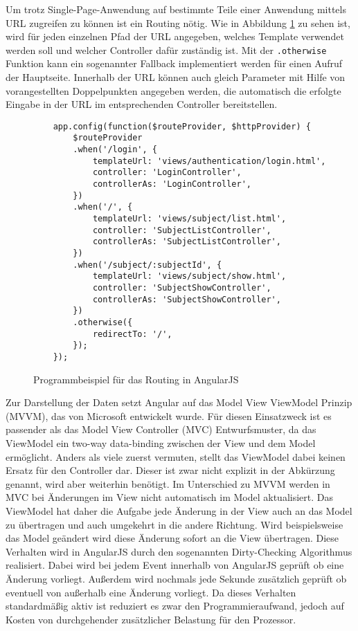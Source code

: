 Um trotz Single-Page-Anwendung auf bestimmte Teile einer Anwendung mittels URL zugreifen zu können ist ein Routing nötig.
Wie in Abbildung \ref{f:angularjs:routing} zu sehen ist, wird für jeden einzelnen Pfad der URL angegeben, welches Template verwendet werden soll und welcher Controller dafür zuständig ist.
Mit der \texttt{.otherwise} Funktion kann ein sogenannter Fallback implementiert werden für einen Aufruf der Hauptseite.
Innerhalb der URL können auch gleich Parameter mit Hilfe von vorangestellten Doppelpunkten angegeben werden, die automatisch die erfolgte Eingabe in der URL im entsprechenden Controller bereitstellen.

\begin{figure}[t]
	\centering
	\begin{lstlisting}
	app.config(function($routeProvider, $httpProvider) {
		$routeProvider
		.when('/login', {
			templateUrl: 'views/authentication/login.html',
			controller: 'LoginController',
			controllerAs: 'LoginController',
		})
		.when('/', {
			templateUrl: 'views/subject/list.html',
			controller: 'SubjectListController',
			controllerAs: 'SubjectListController',
		})
		.when('/subject/:subjectId', {
			templateUrl: 'views/subject/show.html',
			controller: 'SubjectShowController',
			controllerAs: 'SubjectShowController',
		})
		.otherwise({
			redirectTo: '/',
		});		
	});
	\end{lstlisting}
	\caption{Programmbeispiel für das Routing in AngularJS}
	\label{f:angularjs:routing}
\end{figure}

Zur Darstellung der Daten setzt Angular auf das Model View ViewModel Prinzip (MVVM), das von Microsoft entwickelt wurde.
Für diesen Einsatzweck ist es passender als das Model View Controller (MVC) Entwurfsmuster, da das ViewModel ein two-way data-binding zwischen der View und dem Model ermöglicht.
Anders als viele zuerst vermuten, stellt das ViewModel dabei keinen Ersatz für den Controller dar.
Dieser ist zwar nicht explizit in der Abkürzung genannt, wird aber weiterhin benötigt.
Im Unterschied zu MVVM werden in MVC bei Änderungen im View nicht automatisch im Model aktualisiert.
Das ViewModel hat daher die Aufgabe jede Änderung in der View auch an das Model zu übertragen und auch umgekehrt in die andere Richtung.
Wird beispielsweise das Model geändert wird diese Änderung sofort an die View übertragen.
Diese Verhalten wird in AngularJS durch den sogenannten Dirty-Checking Algorithmus realisiert.
Dabei wird bei jedem Event innerhalb von AngularJS geprüft ob eine Änderung vorliegt.
Außerdem wird nochmals jede Sekunde zusätzlich geprüft ob eventuell von außerhalb eine Änderung vorliegt.
Da dieses Verhalten standardmäßig aktiv ist reduziert es zwar den Programmieraufwand, jedoch auf Kosten von durchgehender zusätzlicher Belastung für den Prozessor.

